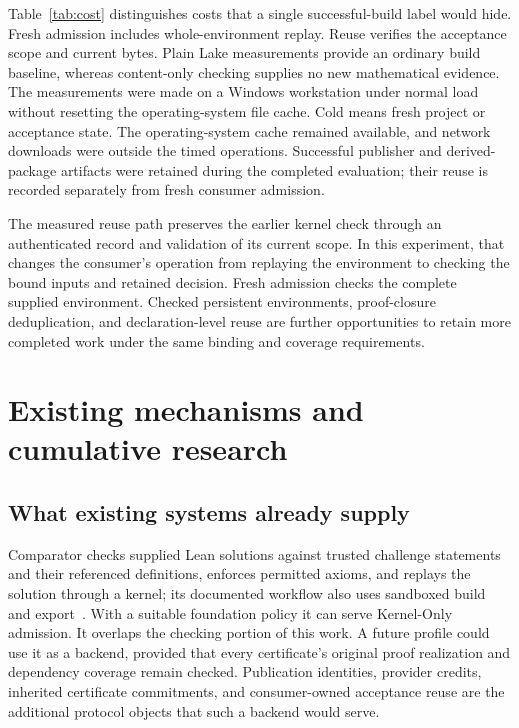 \documentclass[11pt]{article}
\begin{document}
Table~\ref{tab:cost} distinguishes costs that a single successful-build label
would hide. Fresh admission includes whole-environment replay. Reuse verifies
the acceptance scope and current bytes. Plain Lake measurements provide an
ordinary build baseline, whereas content-only checking supplies no new
mathematical evidence. The measurements were made on a Windows workstation
under normal load without resetting the operating-system file cache. Cold
means fresh project or acceptance state. The operating-system cache remained
available, and network downloads were outside the timed operations. Successful publisher and derived-package artifacts
were retained during the completed evaluation; their reuse is recorded
separately from fresh consumer admission.

The measured reuse path preserves the earlier kernel check through an
authenticated record and validation of its current scope. In this experiment,
that changes the consumer's operation from replaying the environment to
checking the bound inputs and retained decision. Fresh admission checks the
complete supplied environment. Checked persistent environments, proof-closure
deduplication, and declaration-level reuse are further opportunities to retain
more completed work under the same binding and coverage requirements.

\section{Existing mechanisms and cumulative research}

\subsection{What existing systems already supply}

Comparator checks supplied Lean solutions against trusted challenge statements
and their referenced definitions, enforces permitted axioms, and replays the
solution through a kernel; its documented workflow also uses sandboxed build
and export~\citep{comparator}. With a suitable foundation policy it can serve
Kernel-Only admission. It overlaps the checking portion of this work. A future
profile could use it as a backend, provided that every certificate's original
proof realization and dependency coverage remain checked. Publication identities, provider credits, inherited
certificate commitments, and consumer-owned acceptance reuse are the additional
protocol objects that such a backend would serve.
\end{document}
